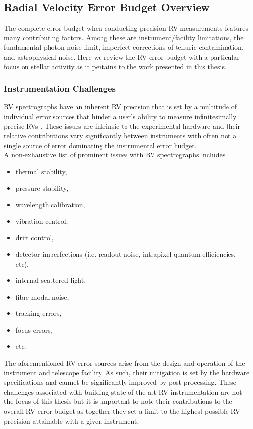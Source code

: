 \subsection{Radial Velocity Error Budget Overview} \label{sect:error}
The complete error budget when conducting precision RV measurements features many contributing factors.
Among these are instrument/facility limitations, the fundamental photon noise limit, imperfect corrections
of telluric contamination, and astrophysical noise. Here we review the RV error budget
with a particular focus on stellar activity as it pertains to the work presented in this thesis.

\subsubsection{Instrumentation Challenges}
RV spectrographs have an inherent RV precision that is set by a multitude of individual error sources
that hinder a user's ability to measure infinitesimally precise
RVs \citep{podgorski14,halverson16}.
These issues are intrinsic to the experimental hardware and their relative contributions
vary significantly between instruments with often not a single source of error dominating the instrumental
error budget. \\

A non-exhaustive list of prominent issues with RV spectrographs includes 

\begin{multicols}{2}
  \begin{itemize}
  \item thermal stability,
  \item pressure stability,
  \item wavelength calibration,
  \item vibration control,
  \item drift control,
  \item detector imperfections (i.e. readout noise, intrapixel quantum efficiencies, etc),
  \item internal scattered light,
  \item fibre modal noise,
  \item tracking errors,
  \item focus errors,
  \item etc.
  \end{itemize}
\end{multicols}
  
\noindent The aforementioned RV error sources arise from the design and operation of the
instrument and telescope facility. As such, their mitigation is set by the hardware specifications
and cannot be significantly improved by post processing. These challenges associated with building
state-of-the-art RV instrumentation are not the focus of
this thesis but it is important to note their contributions to the overall RV error budget as together
they set a limit to the highest possible RV precision attainable with a given instrument.

